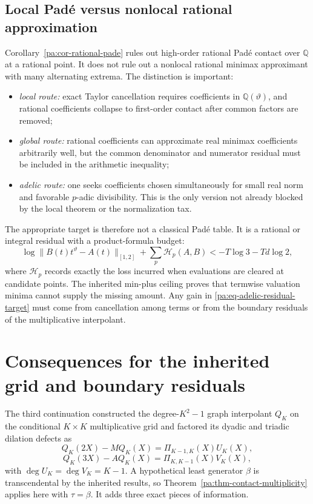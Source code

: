 \documentclass[11pt,oneside]{article}
\theoremstyle{definition}
\theoremstyle{remark}
\newcommand{\Q}{\mathbb Q}
\newcommand{\thetaq}{\vartheta}
\begin{document}
\subsection{Local Pad\'e versus nonlocal rational approximation}

Corollary~\ref{pa:cor-rational-pade} rules out high-order rational Pad\'e contact over \(\Q\)
at a rational point.  It does not rule out a nonlocal rational minimax approximant with many
alternating extrema.  The distinction is important:

\begin{itemize}
\item \emph{local route:} exact Taylor cancellation requires coefficients in
\(\Q(\thetaq)\), and rational coefficients collapse to first-order contact after common
factors are removed;
\item \emph{global route:} rational coefficients can approximate real minimax coefficients
arbitrarily well, but the common denominator and numerator residual must be included in the
arithmetic inequality;
\item \emph{adelic route:} one seeks coefficients chosen simultaneously for small real norm
and favorable \(p\)-adic divisibility.  This is the only version not already blocked by the
local theorem or the normalization tax.
\end{itemize}

The appropriate target is therefore not a classical Pad\'e table.  It is a rational or integral
residual with a product-formula budget:
\begin{equation}
 \log\|B(t)t^{\thetaq}-A(t)\|_{[1,2]}
 +\sum_p \mathcal H_p(A,B)
 <-T\log3-Td\log2,
 \label{pa:eq-adelic-residual-target}
\end{equation}
where \(\mathcal H_p\) records exactly the loss incurred when evaluations are cleared at
candidate points.  The inherited min-plus ceiling proves that termwise valuation minima cannot
supply the missing amount.  Any gain in \eqref{pa:eq-adelic-residual-target} must come from
cancellation among terms or from the boundary residuals of the multiplicative interpolant.

\section{Consequences for the inherited grid and boundary residuals}
\label{pa:sec-boundary-consequences}

The third continuation constructed the degree-\(K^2-1\) graph interpolant \(Q_K\) on the
conditional \(K\times K\) multiplicative grid and factored its dyadic and triadic dilation
defects as
\[
 Q_K(2X)-M Q_K(X)=\Pi_{K-1,K}(X)U_K(X),
\]
\[
 Q_K(3X)-A Q_K(X)=\Pi_{K,K-1}(X)V_K(X),
\]
with \(\deg U_K=\deg V_K=K-1\).  A hypothetical least generator \(\beta\) is
transcendental by the inherited results, so
Theorem~\ref{pa:thm-contact-multiplicity} applies here with \(\tau=\beta\).  It adds three
exact pieces of information.
\end{document}
